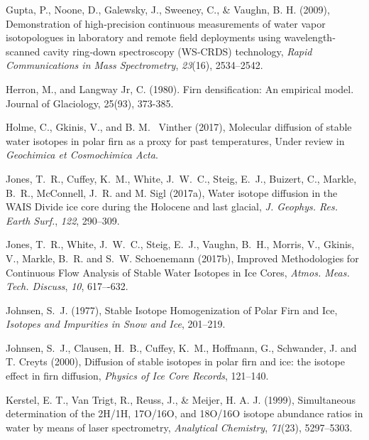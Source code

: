\documentclass[draft, jgrga]{AGUTeX}
\begin{document}
\begin{article}
\begin{thebibliography}{}
Gupta, P., Noone, D., Galewsky, J., Sweeney, C., \& Vaughn, B. H. (2009),
{Demonstration of high‐precision continuous measurements of water vapor isotopologues in laboratory and remote field deployments using wavelength‐scanned cavity ring‐down spectroscopy (WS‐CRDS) technology},
\textit{Rapid Communications in Mass Spectrometry}, \textit{23}(16), 2534--2542.

Herron, M., and Langway Jr, C. (1980). Firn densification: An empirical model. Journal of Glaciology, 25(93), 373-385.

Holme, C., Gkinis, V., and B. M. ~Vinther (2017), Molecular
diffusion of stable water isotopes in polar firn as a proxy
for past temperatures, Under review in \textit{Geochimica et Cosmochimica Acta}.

Jones, T.~R., Cuffey, K.~M., White, J.~W.~C., Steig, E.~J., Buizert, C.,
Markle, B.~R., McConnell, J.~R. and M. Sigl (2017a),
{Water isotope diffusion in the WAIS Divide ice core
	during the Holocene and last glacial},
\textit{J. Geophys. Res. Earth Surf.}, \textit{122}, 290–309.

Jones, T.~R., White, J.~W.~C., Steig, E.~J., Vaughn, B.~H., Morris, V.,
Gkinis, V., Markle, B.~R. and S.~W. Schoenemann (2017b),
{Improved Methodologies for Continuous Flow Analysis of Stable
Water Isotopes in Ice Cores},
\textit{Atmos. Meas. Tech. Discuss}, \textit{10}, 617–-632.

Johnsen, S.~J. (1977),
{Stable Isotope Homogenization of Polar Firn and Ice},
\textit{Isotopes and Impurities in Snow and Ice}, 201--219.

Johnsen, S.~J., Clausen, H.~B., Cuffey, K.~M., Hoffmann, G., Schwander, J. and T. Creyts (2000),
{Diffusion of stable isotopes in polar firn and ice: the isotope effect in firn diffusion},
\textit{Physics of Ice Core Records}, 121--140.

Kerstel, E. T., Van Trigt, R., Reuss, J., \& Meijer, H. A. J. (1999),
{Simultaneous determination of the 2H/1H, 17O/16O, and 18O/16O isotope abundance ratios in water by means of laser spectrometry},
\textit{Analytical Chemistry}, \textit{71}(23), 5297--5303.


\end{thebibliography}
\end{article}
\end{document}
